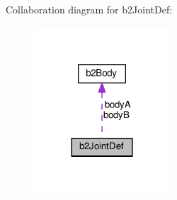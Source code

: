 Collaboration diagram for b2\+Joint\+Def\+:
\nopagebreak
\begin{figure}[H]
\begin{center}
\leavevmode
\includegraphics[width=144pt]{structb2JointDef__coll__graph}
\end{center}
\end{figure}
